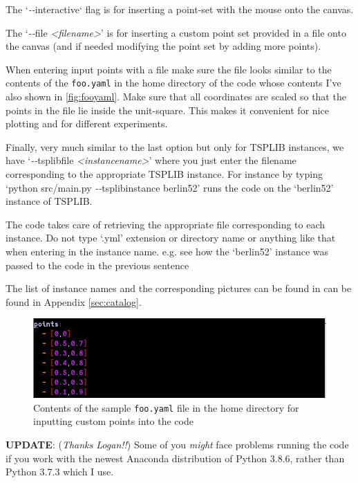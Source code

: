 \begin{appendices}
The `\textit{-}\textit{-}interactive` flag is for inserting a 
point-set with the mouse onto the canvas. 

The `\textit{-}\textit{-}file \textit{<filename>}' is for inserting a 
custom point set provided in a file onto the canvas  (and if needed 
modifying the point set by adding more points). 

When entering input points with a file make sure the file looks similar 
to the contents of the \verb|foo.yaml| in the home directory of the code 
whose contents I've also shown in \autoref{fig:fooyaml}. Make sure that 
all coordinates are scaled so that the points in the file lie inside the unit-square. This makes it convenient 
for nice plotting and for different experiments. 

Finally, very much similar to the last option but only for TSPLIB instances, we have
`\textit{-}\textit{-}tsplibfile \textit{<instancename>}' where you just enter the filename
corresponding to the appropriate TSPLIB instance. For instance by typing
`python src/main.py \textit{-}\textit{-}tsplibinstance berlin52' runs the code on the `berlin52' instance
of TSPLIB. 

\begin{mdframed}
{\color{alizarin} 
The code takes care of retrieving the appropriate file corresponding to each instance. Do not 
type `.yml' extension or directory name or anything like that when entering in the instance name. e.g. see how the `berlin52'
instance was passed to the code in the previous sentence}
\end{mdframed}

The list of instance names and the corresponding pictures can be found in can be found in Appendix \autoref{sec:catalog}. 

\begin{figure}[H]
  \centering
  \includegraphics[width=12cm]{miscimages/fooyaml-screenshot.png}
  \caption{\label{fig:fooyaml} Contents of the sample \texttt{foo.yaml} file in the home directory for inputting custom points into the code}
\end{figure}




\begin{mdframed}[backgroundcolor=black!10,rightline=false,leftline=false]
\textbf{UPDATE}: (\textit{Thanks Logan!!}) Some of you \textit{might} face problems running the code if you work with the newest Anaconda distribution
of Python 3.8.6, rather than Python 3.7.3 which I use. 


\end{mdframed}
\end{appendices}
